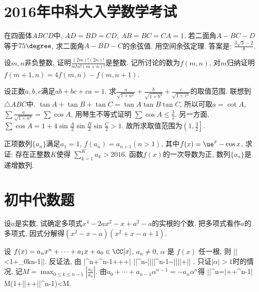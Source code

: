 \section{2016年中科大入学数学考试}
\bq{}{}
在四面体$ABCD$中, $AD=BD=CD$, $AB=BC=CA=1$. 若二面角$A-BC-D$等于$75\degree$, 求二面角$A-BD-C$的余弦值.
\eq
\ba
用空间余弦定理. 答案是: $\frac{3\sqrt{3}-2}{8}$.
\ea

\bq{}{}
设$m,n$非负整数, 证明$\frac{(2m)!(2n)!}{m!n!(m+n)!}$是整数.
\eq
\ba
记所讨论的数为$f(m,n)$, 对$m$归纳证明$f(m+1,n)=4f(m,n)-f(m,n+1)$.
\ea

\bq{}{}
设正数$a, b, c$满足$ab+bc+ca=1$. 求$\frac{a}{\sqrt{1+a^2}}+\frac{b}{\sqrt{1+b^2}}+\frac{c}{\sqrt{1+c^2}}$的取值范围.
\eq
\ba
联想到$\triangle ABC$中, $\tan A+\tan B+\tan C=\tan A\tan B\tan C$,
所以可取$a=\cot A$, $\sum\frac{a}{\sqrt{1+a^2}}=\sum\cos A$, 用琴生不等式证明
$\sum\cos A\le\frac32$. 另一方面, $\sum\cos A=1+4\sin\frac{A}{2}\sin\frac{B}{2}\sin\frac{C}{2}>1$.
故所求取值范围为$\left(1,\frac32\right]$.
\ea

\bq{}{}
正项数列$\{a_n\}$满足$a_1=1$, $f(a_n)=a_{n+1}(n>1)$, 其中$f(x)=\ue^x-\cos x$, 求证: 存在正整数$K$使得
$\sum\limits_{k=1}^{K}a_{k}>2016$.
\eq
\ba
函数$f(x)$的一次导数为正, 数列$\{a_{n}\}$是递增数列.
\ea


\section{初中代数题}
\bq{}{}
设$a$是实数, 试确定多项式$x^4-2ax^2-x+a^2-a$的实根的个数.
\eq
\ba
把多项式看作$a$的多项式, 因式分解得$(x^2-x-a)(x^2+x-a+1)$.
\ea

设 $f(x)=a_nx^n+\cdots+a_1x+a_0\in\CC[x]$, $a_n\ne0$, $\alpha$ 是 $f(x)$ 任一根, 则
\bee
|\alpha|<1+\max_{0\le k\le n-1}\left|\right|.
\eee
\eq
\ba
反证法, 由
\bee
 \left|\alpha^n+\alpha^{n-1}+\cdots+\alpha+\right|
 \ge |\alpha|^n-\left|\right|\cdot|\alpha|^{n-1}-\cdots-\left|\right|\cdot|\alpha|+\left|\right|
 .
\eee
\ea
\ba
只证$|\alpha|>1$时的情况, 记$M=\max_{0\le k\le n-1}\left|\frac{a_k}{a_n}\right|$. 由$a_0+\cdots+a_{n-1}\alpha^{n-1}=-a_{n}\alpha^n$得
\bee
|\alpha|^n=\left|+\cdots+\alpha^{n-1}\right|
\le M(1+|\alpha|+\cdots+|\alpha|^{n-1})<M.
\eee
\ea


